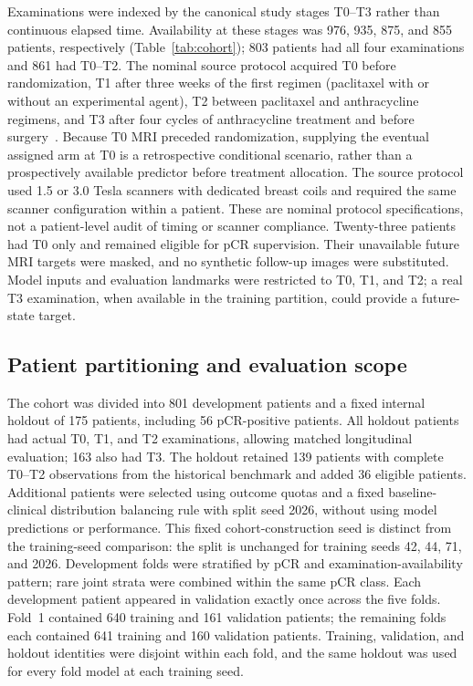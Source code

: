 Examinations were indexed by the canonical study stages T0--T3 rather than
continuous elapsed time. Availability at these stages was 976, 935, 875, and
855 patients, respectively (Table~\ref{tab:cohort}); 803 patients had all four
examinations and 861 had T0--T2. The nominal source protocol acquired T0 before
randomization, T1 after three weeks of the first regimen (paclitaxel with or
without an experimental agent), T2 between paclitaxel and anthracycline
regimens, and T3 after four cycles of anthracycline treatment and before
surgery~\citep{tciaispy2_2022}. Because T0 MRI preceded randomization, supplying
the eventual assigned arm at T0 is a retrospective conditional scenario,
rather than a prospectively available predictor before treatment allocation.
The source protocol used 1.5 or 3.0 Tesla scanners with dedicated breast coils
and required the same scanner configuration within a patient. These are
nominal protocol specifications, not a patient-level audit of timing or
scanner compliance. Twenty-three patients had T0 only and remained
eligible for pCR supervision. Their unavailable future MRI targets were
masked, and no synthetic follow-up images were substituted. Model inputs and
evaluation landmarks were restricted to T0, T1, and T2; a real T3 examination,
when available in the training partition, could provide a future-state target.

\subsection{Patient partitioning and evaluation scope}
The cohort was divided into 801 development patients and a fixed internal
holdout of 175 patients, including 56 pCR-positive patients. All holdout
patients had actual T0, T1, and T2 examinations, allowing matched longitudinal
evaluation; 163 also had T3. The holdout retained 139 patients with complete
T0--T2 observations from the historical benchmark and added 36 eligible
patients. Additional patients were selected using outcome quotas and a fixed
baseline-clinical distribution balancing rule with split seed 2026, without
using model predictions or performance. This fixed cohort-construction seed
is distinct from the training-seed comparison: the split is unchanged for
training seeds 42, 44, 71, and 2026. Development folds were stratified by
pCR and examination-availability pattern; rare joint strata were combined
within the same pCR class. Each development patient appeared in validation
exactly once across the five folds. Fold~1 contained 640 training and 161
validation patients; the remaining folds each contained 641 training and 160
validation patients. Training, validation, and holdout identities were
disjoint within each fold, and the same holdout was used for every fold
model at each training seed.

